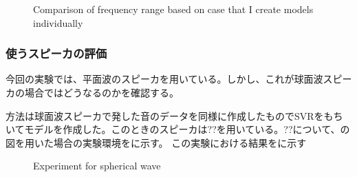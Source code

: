 \begin{figure}[t]
{     \label{fig:6000}}         
     \caption{Comparison of frequency range based on case that I create models individually}
    \label{fig:result_freq_renge_2}
\end{figure}
\clearpage

\subsubsection{使うスピーカの評価}
\label{sec:result_svr_speaker}
今回の実験では、平面波のスピーカを用いている。しかし、これが球面波スピーカの場合ではどうなるのかを確認する。

方法は球面波スピーカで発した音のデータを同様に作成したものでSVRをもちいてモデルを作成した。このときのスピーカは??を用いている。??について、の図を用いた場合の実験環境をに示す。
この実験における結果をに示す

\begin{figure}[ht]
    \centering
    \label{fig:spherical_speaker}
    \label{fig:exp_environment_spherical}
    \caption{Experiment for spherical wave}
    \label{fig:exp_spherical_wave}
\end{figure}

